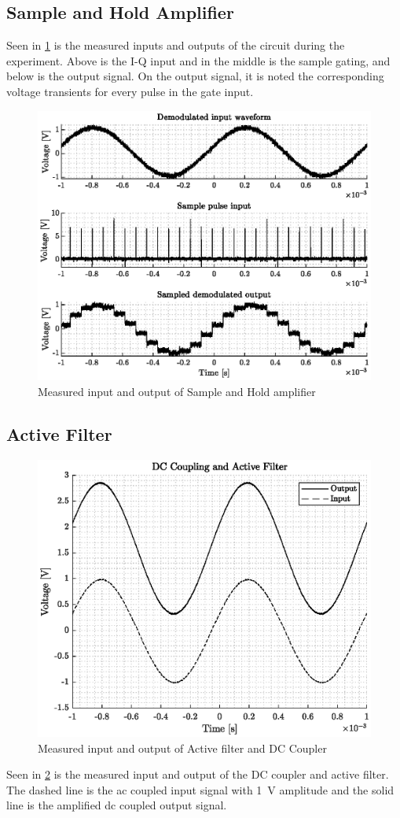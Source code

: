 \subsection{Sample and Hold Amplifier}
Seen in \cref{fig:4_sample_hold_pcb} is the measured inputs and outputs of the circuit during the experiment. Above is the I-Q input and in the middle is the sample gating, and below is the output signal. On the output signal, it is noted the corresponding voltage transients for every pulse in the gate input.
\begin{figure}[htbp]
	\centering
	\includegraphics[width=.8\textwidth]{Figures/4_sampler_pcb.eps}
	\caption{Measured input and output of Sample and Hold amplifier}
	\label{fig:4_sample_hold_pcb}
\end{figure}

\subsection{Active Filter}
\begin{figure}
	\centering
	\includegraphics[width=.8\textwidth]{Figures/5_dccoupler_filter_measurement.eps}
	\caption{Measured input and output of Active filter and DC Coupler}
	\label{fig:5_dccoupler_measured}
\end{figure}
Seen in \cref{fig:5_dccoupler_measured} is the measured input and output of the DC coupler and active filter. The dashed line is the \gls{ac} coupled input signal with \qty{1}{\volt} amplitude and the solid line is the amplified \gls{dc} coupled output signal.

